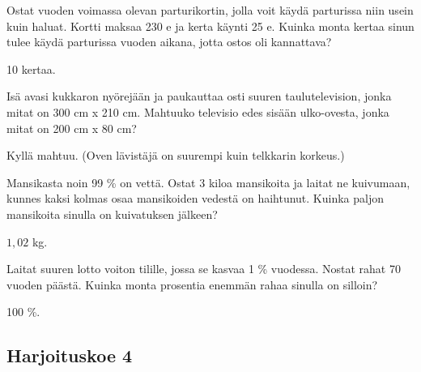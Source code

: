 	\begin{tehtava}
Ostat vuoden voimassa olevan parturikortin, jolla voit käydä parturissa niin usein kuin haluat. Kortti maksaa 230 e ja kerta käynti 25 e. Kuinka monta kertaa sinun tulee käydä parturissa vuoden aikana, jotta ostos oli kannattava?
	\begin{vastaus}
	 10 kertaa.
	\end{vastaus}
	\end{tehtava}
	\begin{tehtava}
Isä avasi kukkaron nyörejään ja paukauttaa osti suuren taulutelevision, jonka mitat on 300 cm x 210 cm. Mahtuuko televisio edes sisään ulko-ovesta, jonka mitat on 200 cm x 80 cm?
	\begin{vastaus}
	 Kyllä mahtuu. (Oven lävistäjä on suurempi kuin telkkarin korkeus.)
	\end{vastaus}
	\end{tehtava}
	\begin{tehtava}
Mansikasta noin 99 \% on vettä. Ostat 3 kiloa mansikoita ja laitat ne kuivumaan, kunnes kaksi kolmas osaa mansikoiden vedestä on haihtunut. Kuinka paljon mansikoita sinulla on kuivatuksen jälkeen?
	\begin{vastaus}
	 $1,02$ kg.
	\end{vastaus}
	\end{tehtava}
	\begin{tehtava}
Laitat suuren lotto voiton tilille, jossa se kasvaa 1 \% vuodessa. Nostat rahat 70 vuoden päästä. Kuinka monta prosentia enemmän rahaa sinulla on silloin?
	\begin{vastaus}
	 100 \%.
	\end{vastaus}
	\end{tehtava}
	
\subsection*{Harjoituskoe 4}
	
